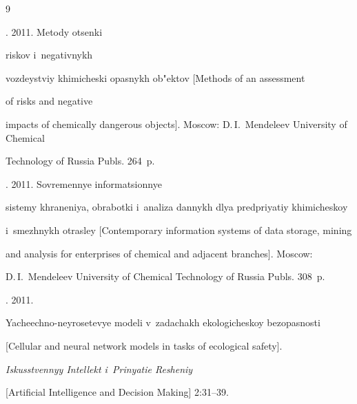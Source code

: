 




\vspace*{-6pt}





{\small\frenchspacing


{%




\begin{thebibliography}{9} 




  . 2011. Metody otsenki 


  riskov i~negativnykh 


vozdeystviy khimicheski opasnykh ob"ektov [Methods of an assessment 


of risks and negative 


impacts of chemically dangerous objects]. Moscow: D.\,I.~Mendeleev University of Chemical 


Technology of Russia Publs. 264~p.




  . 2011. Sovremennye informatsionnye 


  sistemy  khraneniya, obrabotki i~analiza dannykh dlya predpriyatiy khimicheskoy 


i~smezhnykh otrasley [Contemporary information systems of data storage, mining 


and analysis for  enterprises of chemical and adjacent branches]. Moscow: 


D.\,I.~Mendeleev University of  Chemical Technology of Russia Publs. 308~p.




  . 2011. 


Yacheechno-neyrosetevye modeli v~zadachakh ekologicheskoy bezopasnosti 


[Cellular and neural  network models in tasks of ecological safety]. 


\textit{Iskusstvennyy Intellekt i~Prinyatie Resheniy} 


[Artificial Intelligence and Decision Making] 2:31--39.





\end{thebibliography}}}
